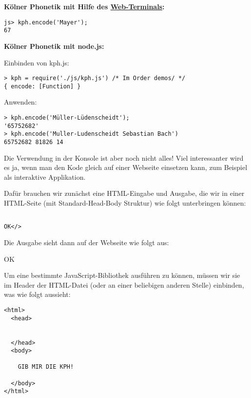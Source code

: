 \vspace{0.5cm}\par\noindent\textbf{Kölner Phonetik mit Hilfe des\vspace{0.5cm}
\href{../demos/console.html}{Web-Terminals}:}

\begin{verbatim}
js> kph.encode('Mayer');
67
\end{verbatim}

{ }



\vspace{0.5cm}\par\noindent\textbf{Kölner Phonetik mit node.js:}\vspace{0.5cm}

{Einbinden von kph.js:}

\begin{verbatim}
> kph = require('./js/kph.js') /* Im Order demos/ */
{ encode: [Function] }
\end{verbatim}

{Anwenden:}

\begin{verbatim}
> kph.encode('Müller-Lüdenscheidt');
'65752682'
> kph.encode('Muller-Ludenscheidt Sebastian Bach')
65752682 81826 14
\end{verbatim}



Die Verwendung in der Konsole ist aber noch nicht alles! Viel
interessanter wird es ja, wenn man den Kode gleich auf einer Webseite
einsetzen kann, zum Beispiel als interaktive Applikation.

Dafür brauchen wir zunächst eine HTML-Eingabe und Ausgabe, die wir in
einer HTML-Seite (mit Standard-Head-Body Struktur) wie folgt
unterbringen können:

\begin{verbatim}

OK</>
\end{verbatim}

{Die Ausgabe sieht dann auf der Webseite wie folgt aus:}

OK




Um eine bestimmte JavaScript-Bibliothek ausführen zu können, müssen wir
sie im Header der HTML-Datei (oder an einer beliebigen anderen Stelle)
einbinden, was wie folgt aussieht:

\begin{verbatim}
<html>
  <head>
    
    
  </head>
  <body>
    
    GIB MIR DIE KPH!
    
  </body>
</html>
\end{verbatim}



